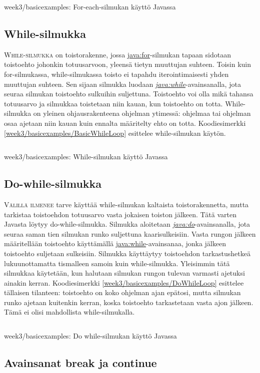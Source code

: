 \documentclass[openany]{book}
\newcommand{\newthought}[1]{\smallskip\textsc{#1}}
\newcommand{\java}[1]{\underline{\gls{java:#1}}}
\newcommand{\newjava}[1]{\textit{\java{#1}}}
\newcommand{\code}[3]{
	\begin{listing}
		\linespread{0.85}
		\inputminted{java}{OhjelmointiopasEsimerkit/src/#1/#2.java}
		\caption{#1: #3}
		\label{#1/#2}
	\end{listing}
}
\begin{document}
\code{week3/basicexamples}{ForEachLoop}{For-each-silmukan käyttö Javassa}

\subsection{While-silmukka}
\label{while}

\newthought{While-silmukka} on toistorakenne, jossa \java{for}-silmukan tapaan sidotaan toistoehto
johonkin totuusarvoon, yleensä tietyn muuttujan suhteen. Toisin kuin for-silmukassa,
while-silmukassa toisto ei tapahdu iterointimaisesti yhden muuttujan suhteen. Sen sijaan silmukka
luodaan \newjava{while}-avainsanalla, jota seuraa silmukan toistoehto sulkuihin suljettuna.
Toistoehto voi olla mikä tahansa totuusarvo ja silmukkaa toistetaan niin kauan, kun toistoehto on
totta. While-silmukka on yleinen ohjausrakenteena ohjelman ytimessä: ohjelmaa tai ohjelman osaa
ajetaan niin kauan kuin ennalta määritelty ehto on totta. Koodiesimerkki 
\ref{week3/basicexamples/BasicWhileLoop} esittelee while-silmukan käytön.

\code{week3/basicexamples}{BasicWhileLoop}{While-silmukan käyttö Javassa}

\subsection{Do-while-silmukka}
\label{do while}

\newthought{Välillä ilmenee} tarve käyttää while-silmukan kaltaista toistorakennetta, mutta
tarkistaa toistoehdon totuusarvo vasta jokaisen toiston jälkeen. Tätä varten Javasta löytyy 
do-while-silmukka. Silmukka aloitetaan \newjava{do}-avainsanalla, jota seuraa saman tien silmukan
runko suljettuna kaarisulkeisiin. Vasta rungon jälkeen määritellään toistoehto käyttämällä
\java{while}-avainsanaa, jonka jälkeen toistoehto suljetaan sulkeisiin. Silmukka käyttäytyy
toistoehdon tarkastushetkeä lukuunottamatta tismalleen samoin kuin while-silmukka. Yleisimmin tätä
silmukkaa käytetään, kun halutaan silmukan rungon tulevan varmasti ajetuksi ainakin kerran.
Koodiesimerkki \ref{week3/basicexamples/DoWhileLoop} esittelee tällaisen tilanteen: toistoehto on
koko ohjelman ajan epätosi, mutta silmukan runko ajetaan kuitenkin kerran, koska toistoehto
tarkastetaan vasta ajon jälkeen. Tämä ei olisi mahdollista while-silmukalla.

\code{week3/basicexamples}{DoWhileLoop}{Do while-silmukan käyttö Javassa}

\subsection{Avainsanat break ja continue}
\label{break continue}
\end{document}
